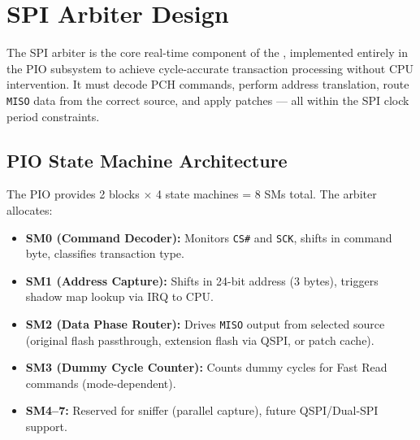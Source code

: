 \section{\ac{SPI} Arbiter Design}
\label{sec:spi_arbiter}

The \ac{SPI} arbiter is the core real-time component of the \vbfc, implemented entirely in the \rp \ac{PIO} subsystem to achieve cycle-accurate transaction processing without CPU intervention. It must decode \ac{PCH} commands, perform address translation, route \texttt{MISO} data from the correct source, and apply patches — all within the \ac{SPI} clock period constraints.

\subsection{\ac{PIO} State Machine Architecture}
The \rp \ac{PIO} provides 2 blocks $\times$ 4 state machines = 8 SMs total. The arbiter allocates:
\begin{itemize}
    \item \textbf{SM0 (Command Decoder):} Monitors \texttt{CS\#} and \texttt{SCK}, shifts in command byte, classifies transaction type.
    \item \textbf{SM1 (Address Capture):} Shifts in 24-bit address (3 bytes), triggers shadow map lookup via IRQ to CPU.
    \item \textbf{SM2 (Data Phase Router):} Drives \texttt{MISO} output from selected source (original flash passthrough, extension flash via QSPI, or patch cache).
    \item \textbf{SM3 (Dummy Cycle Counter):} Counts dummy cycles for Fast Read commands (mode-dependent).
    \item \textbf{SM4--7:} Reserved for sniffer (parallel capture), future QSPI/Dual-SPI support.
\end{itemize}

